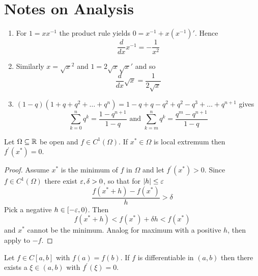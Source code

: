 
\newpage
\section{Notes on Analysis}

\begin{lemma}\hfill
    \begin{enumerate}
        \item For \( 1 = x x^{-1} \) the product rule yields \( 0 = x^{-1} + x(x^{-1})' \). Hence
            \[
                \frac{d}{dx} x^{-1} = -\frac{1}{x^2}
            \]
        \item Similarly \( x = \sqrt{x}^2 \) and \( 1 = 2 \sqrt{x} \sqrt{x}' \) and so
            \[
                \frac{d}{dx} \sqrt{x} = \frac{1}{2\sqrt{x}}
            \]
        \item \( (1 - q) (1 + q + q^2 + \ldots + q^n) = 1 - q + q - q^2 + q^2 - q^3 + \ldots + q^{n+1} \) gives
            \[
                \sum_{k=0}^n q^k = \frac{1 - q^{n+1}}{1 - q} \text { and }
                \sum_{k=m}^n q^k = \frac{q^m - q^{n+1}}{1 - q}
            \]

    \end{enumerate}
\end{lemma}
\bigskip

\begin{theorem}\label{thm:fermat_stationary_point}
Let \( \Omega \subseteq \mathbb{R} \) be open and \( f \in C^1(\Omega) \). If \( x^* \in \Omega \) is local extremum 
then \( f^\prime(x^*) = 0 \).
\end{theorem}

\begin{proof}
Assume \( x^* \) is the minimum of \( f \) in \( \Omega \) and let \( f^\prime(x^*) > 0 \). 
Since \( f \in C^1(\Omega) \) there exist \( \varepsilon, \delta > 0 \), so that for \( |h| \le \varepsilon \)
\[
    \frac{f(x^* + h) - f(x^*)}{h} > \delta
\]
Pick a negative \( h \in [-\varepsilon, 0) \). Then 
\[
     f(x^* + h) < f(x^*) +  \delta h < f(x^*) 
\]
and \( x^* \) cannot be the minimum. Analog for maximum with a positive \( h \), then apply to \( -f \).
\end{proof}
\bigskip


\begin{theorem}[Rolle]\label{thm:rolle}
Let \( f \in C[a,b] \) with \( f(a) = f(b) \). If \( f \) is differentiable in \( (a, b) \) then 
there exists a \( \xi \in (a,b) \) with \( f^\prime(\xi) = 0 \).
\end{theorem}

